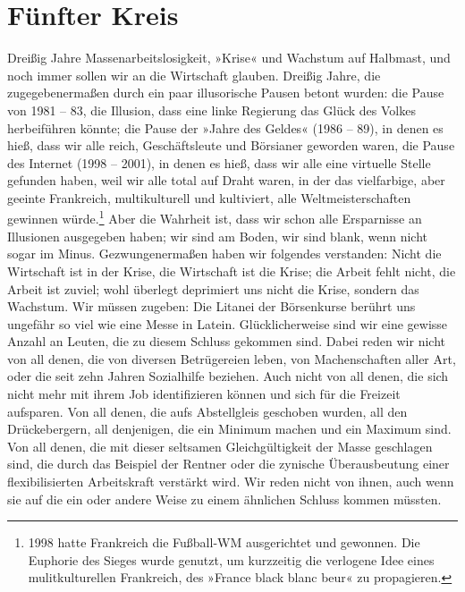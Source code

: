 \section{Fünfter Kreis}


Dreißig Jahre Massenarbeitslosigkeit, »Krise« und Wachstum auf
Halbmast, und noch immer sollen wir an die Wirtschaft glauben.
Dreißig Jahre, die zugegebenermaßen durch ein paar illusorische
Pausen betont wurden: die Pause von 1981 – 83, die Illusion, dass
eine linke Regierung das Glück des Volkes herbeiführen könnte; die
Pause der »Jahre des Geldes« (1986 – 89), in denen es hieß, dass
wir alle reich, Geschäftsleute und Börsianer geworden waren, die
Pause des Internet (1998 – 2001), in denen es hieß, dass wir alle
eine virtuelle Stelle gefunden haben, weil wir alle total auf Draht
waren, in der das vielfarbige, aber geeinte Frankreich,
multikulturell und kultiviert, alle Weltmeisterschaften gewinnen
würde.\footnote{
1998 hatte Frankreich die Fußball-WM ausgerichtet und gewonnen.
Die Euphorie des Sieges wurde genutzt, um kurzzeitig die verlogene
Idee eines mulitkulturellen Frankreich, des »France black blanc
beur« zu propagieren.
}
Aber die Wahrheit ist, dass wir schon alle Ersparnisse an
Illusionen ausgegeben haben; wir sind am Boden, wir sind blank,
wenn nicht sogar im Minus.
Gezwungenermaßen haben wir folgendes verstanden: Nicht die
Wirtschaft ist in der Krise, die Wirtschaft ist die Krise; die
Arbeit fehlt nicht, die Arbeit ist zuviel; wohl überlegt deprimiert
uns nicht die Krise, sondern das Wachstum. Wir müssen zugeben: Die
Litanei der Börsenkurse berührt uns ungefähr so viel wie eine Messe
in Latein. Glücklicherweise sind wir eine gewisse Anzahl an Leuten,
die zu diesem Schluss gekommen sind. Dabei reden wir nicht von all
denen, die von diversen Betrügereien leben, von Machenschaften
aller Art, oder die seit zehn Jahren Sozialhilfe beziehen. Auch
nicht von all denen, die sich nicht mehr mit ihrem Job
identifizieren können und sich für die Freizeit aufsparen. Von all
denen, die aufs Abstellgleis geschoben wurden, all den
Drückebergern, all denjenigen, die ein Minimum machen und ein
Maximum sind. Von all denen, die mit dieser seltsamen
Gleichgültigkeit der Masse geschlagen sind, die durch das Beispiel
der Rentner oder die zynische Überausbeutung einer flexibilisierten
Arbeitskraft verstärkt wird. Wir reden nicht von ihnen, auch wenn
sie auf die ein oder andere Weise zu einem ähnlichen Schluss kommen
müssten.

